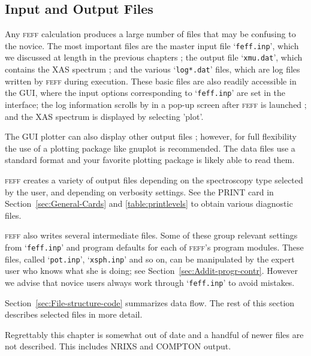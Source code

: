 \documentclass[11pt,oneside]{report} %
\renewcommand{\htmlref}[2]{\hyperlink{#2}{#1}}
\newcommand{\program}[1]{\textsc{#1}}
\newcommand{\feff}{\program{feff}}
\newcommand{\file}[1]{`\texttt{#1}'}
\renewcommand{\htmlref}[2]{{#1}} %
\begin{document}
\begin{latexonly}%

\chapter{Input and Output Files}
\label{sec:Input-and-Output-Files}

Any {\feff} calculation produces a large number of files that may be confusing to the novice.  
The most important files are the master input file \file{feff.inp}, which we discussed at length in the previous chapters ;
the output file \file{xmu.dat}, which contains the XAS spectrum ; and the various \file{log*.dat} files, which are log files
written by {\feff} during execution.  These basic files are also readily accessible in the GUI, where the input options corresponding to
\file{feff.inp} are set in the interface; the log information scrolls by in a pop-up screen after {\feff} is launched ; and the XAS spectrum
is displayed by selecting 'plot'.

The GUI plotter can also display other output files ; however, for full flexibility the use of a plotting package like gnuplot is recommended.  The data files use a standard format and your favorite plotting package is likely able to read them.

{\feff} creates a variety of output files depending on the spectroscopy type selected by the user, and depending on verbosity settings.
See the \htmlref{PRINT}{card:pri} card in Section~\ref{sec:General-Cards} and \ref{table:printlevels} to obtain various diagnostic files.

{\feff} also writes several intermediate files.  Some of these group relevant settings from \file{feff.inp} and program defaults for each of 
{\feff}'s program modules.  These files, called \file{pot.inp}, \file{xsph.inp} and so on, can be manipulated by the expert user who knows what she is doing; see Section~\ref{sec:Addit-progr-contr}.
However we advise that novice users always work through \file{feff.inp} to avoid mistakes. 

Section~\ref{sec:File-structure-code} summarizes data flow.  The rest of this section describes selected files in more detail.

Regrettably this chapter is somewhat out of date and a handful of newer files are not described.  This includes NRIXS and COMPTON output.


\end{latexonly}
\end{document}
